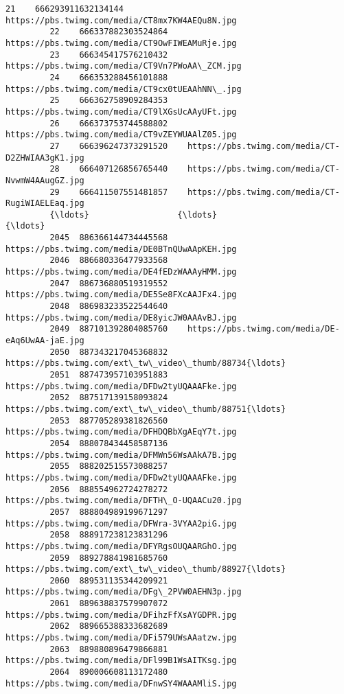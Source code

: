 \documentclass[11pt]{article}
\begin{document}
\begin{Verbatim}[commandchars=\\\{\}]
         21    666293911632134144    https://pbs.twimg.com/media/CT8mx7KW4AEQu8N.jpg   
         22    666337882303524864    https://pbs.twimg.com/media/CT9OwFIWEAMuRje.jpg   
         23    666345417576210432    https://pbs.twimg.com/media/CT9Vn7PWoAA\_ZCM.jpg   
         24    666353288456101888    https://pbs.twimg.com/media/CT9cx0tUEAAhNN\_.jpg   
         25    666362758909284353    https://pbs.twimg.com/media/CT9lXGsUcAAyUFt.jpg   
         26    666373753744588802    https://pbs.twimg.com/media/CT9vZEYWUAAlZ05.jpg   
         27    666396247373291520    https://pbs.twimg.com/media/CT-D2ZHWIAA3gK1.jpg   
         28    666407126856765440    https://pbs.twimg.com/media/CT-NvwmW4AAugGZ.jpg   
         29    666411507551481857    https://pbs.twimg.com/media/CT-RugiWIAELEaq.jpg   
         {\ldots}                  {\ldots}                                                {\ldots}   
         2045  886366144734445568    https://pbs.twimg.com/media/DE0BTnQUwAApKEH.jpg   
         2046  886680336477933568    https://pbs.twimg.com/media/DE4fEDzWAAAyHMM.jpg   
         2047  886736880519319552    https://pbs.twimg.com/media/DE5Se8FXcAAJFx4.jpg   
         2048  886983233522544640    https://pbs.twimg.com/media/DE8yicJW0AAAvBJ.jpg   
         2049  887101392804085760    https://pbs.twimg.com/media/DE-eAq6UwAA-jaE.jpg   
         2050  887343217045368832  https://pbs.twimg.com/ext\_tw\_video\_thumb/88734{\ldots}   
         2051  887473957103951883    https://pbs.twimg.com/media/DFDw2tyUQAAAFke.jpg   
         2052  887517139158093824  https://pbs.twimg.com/ext\_tw\_video\_thumb/88751{\ldots}   
         2053  887705289381826560    https://pbs.twimg.com/media/DFHDQBbXgAEqY7t.jpg   
         2054  888078434458587136    https://pbs.twimg.com/media/DFMWn56WsAAkA7B.jpg   
         2055  888202515573088257    https://pbs.twimg.com/media/DFDw2tyUQAAAFke.jpg   
         2056  888554962724278272    https://pbs.twimg.com/media/DFTH\_O-UQAACu20.jpg   
         2057  888804989199671297    https://pbs.twimg.com/media/DFWra-3VYAA2piG.jpg   
         2058  888917238123831296    https://pbs.twimg.com/media/DFYRgsOUQAARGhO.jpg   
         2059  889278841981685760  https://pbs.twimg.com/ext\_tw\_video\_thumb/88927{\ldots}   
         2060  889531135344209921    https://pbs.twimg.com/media/DFg\_2PVW0AEHN3p.jpg   
         2061  889638837579907072    https://pbs.twimg.com/media/DFihzFfXsAYGDPR.jpg   
         2062  889665388333682689    https://pbs.twimg.com/media/DFi579UWsAAatzw.jpg   
         2063  889880896479866881    https://pbs.twimg.com/media/DFl99B1WsAITKsg.jpg   
         2064  890006608113172480    https://pbs.twimg.com/media/DFnwSY4WAAAMliS.jpg   

\end{Verbatim}
\end{document}
